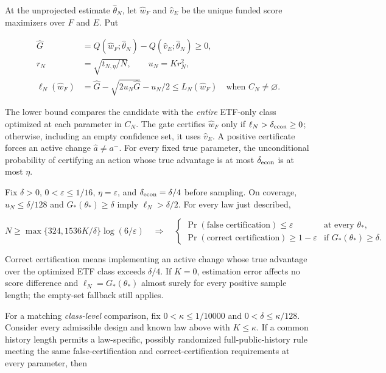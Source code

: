 \documentclass[11pt]{article}
\begin{document}
At the unprojected estimate \(\widehat\theta_N\), let
\(\widehat w_F\) and \(\widehat v_E\) be the unique funded
score maximizers over \(F\) and \(E\). Put

\begin{equation*}
\begin{aligned}
\widehat G
 &=Q(\widehat w_F;\widehat\theta_N)
   -Q(\widehat v_E;\widehat\theta_N)\geq0,\\
r_N&=\sqrt{t_{N,\eta}/N},\qquad u_N=K r_N^2,\\
\ell_N(\widehat w_F)
 &=\widehat G-\sqrt{2u_N\widehat G}-u_N/2
 \leq L_N(\widehat w_F)
 \quad\text{when }C_N\ne\varnothing.
\end{aligned}\tag{48}\label{eq:48}
\end{equation*}

The lower bound compares the candidate with the \emph{entire}
ETF-only class optimized at each parameter in \(C_N\). The
gate certifies \(\widehat w_F\) only if
\(\ell_N>\delta_{\rm econ}\geq0\); otherwise, including
an empty confidence set, it uses \(\widehat v_E\). A
positive certificate forces an active change
\(\widehat a\ne a^-\). For every fixed true parameter, the
unconditional probability of certifying an action whose true
advantage is at most \(\delta_{\rm econ}\) is at most \(\eta\).

Fix \(\delta>0\), \(0<\varepsilon\leq1/16\),
\(\eta=\varepsilon\), and
\(\delta_{\rm econ}=\delta/4\) before sampling. On
coverage, \(u_N\leq\delta/128\) and
\(G_*(\theta_*)\geq\delta\) imply
\(\ell_N>\delta/2\). For every law just described,

\begin{equation*}
N\geq\max\{324,1536K/\delta\}\log(6/\varepsilon)
\quad\Longrightarrow\quad
\begin{cases}
\Pr(\text{false certification})\leq\varepsilon
  &\text{at every }\theta_*,\\
\Pr(\text{correct certification})\geq1-\varepsilon
  &\text{if }G_*(\theta_*)\geq\delta.
\end{cases}\tag{49}\label{eq:49}
\end{equation*}

Correct certification means implementing an active change
whose true advantage over the optimized ETF class exceeds
\(\delta/4\). If \(K=0\), estimation error affects no
score difference and \(\ell_N=G_*(\theta_*)\) almost surely
for every positive sample length; the empty-set fallback
still applies.

For a matching \emph{class-level} comparison, fix
\(0<\kappa\leq1/10000\) and
\(0<\delta\leq\kappa/128\). Consider every admissible
design and known law above with \(K\leq\kappa\). If a common
history length permits a law-specific, possibly randomized
full-public-history rule meeting the same false-certification
and correct-certification requirements at every parameter,
then
\end{document}

